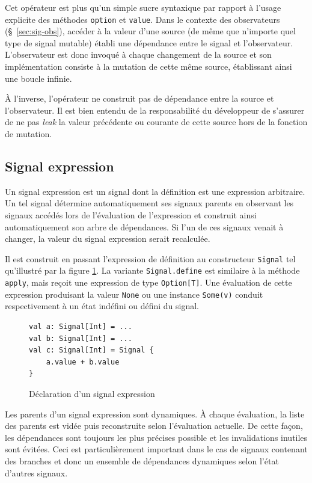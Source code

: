 Cet opérateur est plus qu'un simple sucre syntaxique par rapport à l'usage explicite des méthodes \texttt{option} et \texttt{value}. Dans le contexte des observateurs (§~\ref{sec:sig-obs}), accéder à la valeur d'une source (de même que n'importe quel type de signal mutable) établi une dépendance entre le signal et l'observateur. L'observateur est donc invoqué à chaque changement de la source et son implémentation consiste à la mutation de cette même source, établissant ainsi une boucle infinie.

À l'inverse, l'opérateur \code{~=} ne construit pas de dépendance entre la source et l'observateur. Il est bien entendu de la responsabilité du développeur de s'assurer de ne pas \emph{leak} la valeur précédente ou courante de cette source hors de la fonction de mutation.

\subsection{Signal expression} \label{sec:sig-expr}

Un signal expression est un signal dont la définition est une expression arbitraire. Un tel signal détermine automatiquement ses signaux parents en observant les signaux accédés lors de l'évaluation de l'expression et construit ainsi automatiquement son arbre de dépendances. Si l'un de ces signaux venait à changer, la valeur du signal expression serait recalculée.

Il est construit en passant l'expression de définition au constructeur \texttt{Signal} tel qu'illustré par la figure \ref{fig:signal-expr-init}. La variante \texttt{Signal.define} est similaire à la méthode \texttt{apply}, mais reçoit une expression de type \texttt{Option[T]}. Une évaluation de cette expression produisant la valeur \texttt{None} ou une instance \texttt{Some(v)} conduit respectivement à un état indéfini ou défini du signal.

\begin{figure}[!h]
	\begin{lstlisting}
val a: Signal[Int] = ...
val b: Signal[Int] = ...
val c: Signal[Int] = Signal {
	a.value + b.value
}
	\end{lstlisting}
	\caption{Déclaration d'un signal expression}
	\label{fig:signal-expr-init}
\end{figure}

Les parents d'un signal expression sont dynamiques. À chaque évaluation, la liste des parents est vidée puis reconstruite selon l'évaluation actuelle. De cette façon, les dépendances sont toujours les plus précises possible et les invalidations inutiles sont évitées. Ceci est particulièrement important dans le cas de signaux contenant des branches et donc un ensemble de dépendances dynamiques selon l'état d'autres signaux.


